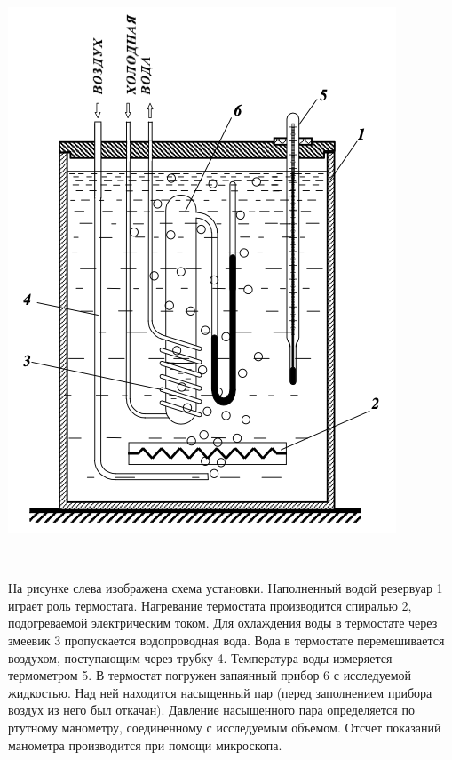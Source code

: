\begin{center}
\begin{minipage}{0.47\textwidth}
  \includegraphics[width=1\linewidth]{2.jpg}
\end{minipage}
\begin{minipage}{0.04\textwidth}
\
\end{minipage}
\begin{minipage}{0.47\textwidth}
 На рисунке слева изображена схема установки.  Наполненный водой резервуар 1 играет роль термостата. Нагревание термостата производится спиралью 2, подогреваемой электрическим током. Для охлаждения воды в термостате через змеевик 3 пропускается водопроводная вода. Вода в термостате перемешивается воздухом, поступающим через трубку 4. Температура воды измеряется термометром 5. В термостат погружен запаянный прибор 6 с исследуемой жидкостью. Над ней находится насыщенный пар (перед заполнением прибора воздух из него был откачан). Давление насыщенного пара определяется по ртутному манометру, соединенному с исследуемым объемом. Отсчет показаний манометра производится при помощи микроскопа.\\
\end{minipage}
\end{center}

